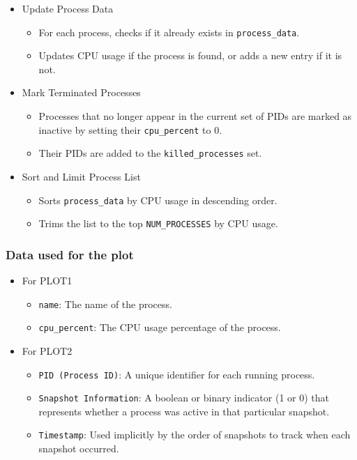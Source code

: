\documentclass[12pt]{article}
\begin{document}
\begin{itemize}
\begin{itemize}
\begin{itemize}
    \item {Update Process Data}
\begin{itemize}
    \item For each process, checks if it already exists in \texttt{process\_data}.
    \item Updates CPU usage if the process is found, or adds a new entry if it is not.
\end{itemize}
 
\item {Mark Terminated Processes}
\begin{itemize}
    \item Processes that no longer appear in the current set of PIDs are marked as inactive by setting their \texttt{cpu\_percent} to 0.
    \item Their PIDs are added to the \texttt{killed\_processes} set.
\end{itemize}

\item {Sort and Limit Process List}
\begin{itemize}
    \item Sorts \texttt{process\_data} by CPU usage in descending order.
    \item Trims the list to the top \texttt{NUM\_PROCESSES} by CPU usage.
\end{itemize}
\end{itemize}

\end{itemize}

\end{itemize}



\subsubsection{Data used for the plot}
\begin{itemize}
    \item For PLOT1
    \begin{itemize}
        \item \texttt{name}: The name of the process.
        \item \texttt{cpu\_percent}: The CPU usage percentage of the process.
    \end{itemize}
    \item For PLOT2
    \begin{itemize}
        \item \texttt{PID (Process ID)}: A unique identifier for each running process.
        \item \texttt{Snapshot Information}: A boolean or binary indicator (1 or 0) that represents whether a process was active in that particular snapshot.
        \item \texttt{Timestamp}: Used implicitly by the order of snapshots to track when each snapshot occurred.
    \end{itemize}

\end{itemize}
\end{document}

